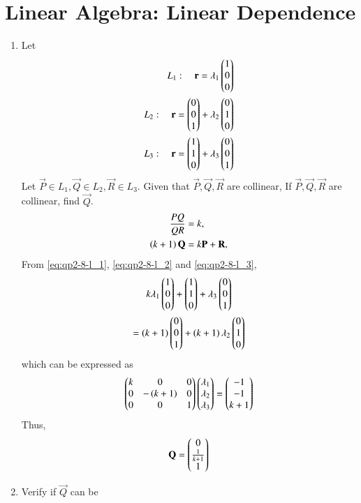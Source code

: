 \documentclass[journal,12pt,twocolumn]{IEEEtran}
\renewcommand\thesection{\arabic{section}}
\begin{document}
\section{Linear Algebra: Linear Dependence}
\begin{enumerate}[label=\thesection.\arabic*
,ref=\thesection.\theenumi]
\item Let
\begin{align}
\label{eq:qp2-8-l_1}
L_1: \quad \mathbf{r} = \lambda_1 \begin{pmatrix}1\\0\\0\end{pmatrix}
\\
\label{eq:qp2-8-l_2}
L_2: \quad \mathbf{r} = \begin{pmatrix}0\\0\\1\end{pmatrix}+\lambda_2 \begin{pmatrix}0\\1\\0\end{pmatrix}
\\
L_3: \quad \mathbf{r} =  \begin{pmatrix}1\\1\\0\end{pmatrix}+\lambda_3 \begin{pmatrix}0\\0\\1\end{pmatrix}
\label{eq:qp2-8-l_3}
\end{align}
%
Let $\vec{P}\in L_1, \vec{Q}\in L_2, \vec{R}\in L_3$. Given that   $\vec{P},\vec{Q},\vec{R}$ are collinear,
If $\vec{P},\vec{Q},\vec{R}$ are collinear, find $\vec{Q}$.
\\
\solution 
\begin{align}
\frac{PQ}{QR} &= k,
\\
\left(k+1\right)\mathbf{Q} &= k\mathbf{P}+ \mathbf{R},
\label{eq:qp2-8-coll}
\end{align}
From \eqref{eq:qp2-8-l_1}, \eqref{eq:qp2-8-l_2} and \eqref{eq:qp2-8-l_3},
\begin{multline}
k \lambda_1 \begin{pmatrix}1\\0\\0\end{pmatrix}
+\begin{pmatrix}1\\1\\0\end{pmatrix}+\lambda_3 \begin{pmatrix}0\\0\\1\end{pmatrix}
\\
=
\left(k+1\right) \begin{pmatrix}0\\0\\1\end{pmatrix}+\left(k+1\right)\lambda_2 \begin{pmatrix}0\\1\\0\end{pmatrix}
\end{multline}
%
which can be expressed as
\begin{align}
\begin{pmatrix}k & 0 & 0
\\
0 & -\left(k+1\right) & 0
\\
0 & 0 & 1
\end{pmatrix}
\begin{pmatrix}\lambda_1\\\lambda_2\\ \lambda_3\end{pmatrix}
=\begin{pmatrix}-1 \\ -1 \\ k+1\end{pmatrix}
\end{align}
%
Thus,
\begin{align}
\mathbf{Q} = \begin{pmatrix}0 \\\frac{1}{k+1} \\1\end{pmatrix}
\end{align}
\item Verify if  $\vec{Q}$ can be 


\end{enumerate}
\end{document}
